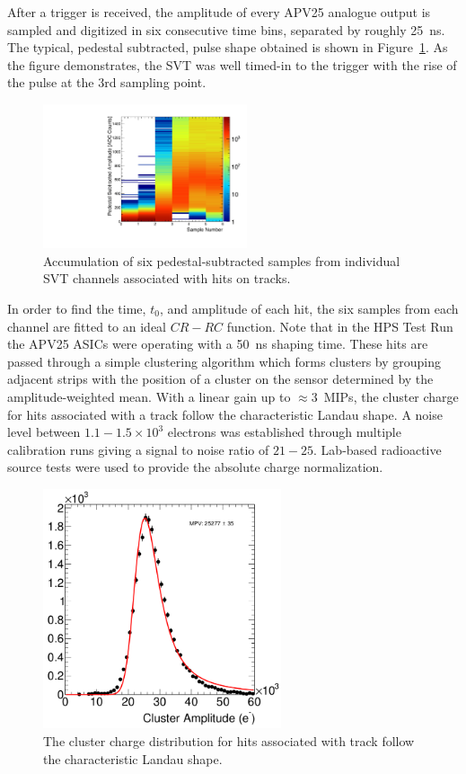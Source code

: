 \documentclass[final,3p,times,twocolumn]{elsarticle}
\begin{document}
After a trigger is received, the amplitude  of every  APV25 analogue output is sampled and digitized in 
six consecutive time bins, separated by roughly 25~ns.  
The typical, pedestal subtracted, pulse shape obtained is shown in Figure~\ref{fig:pulse_shape}. 
As the figure demonstrates,  the SVT was well timed-in to the trigger with the rise of the pulse at the 3rd 
sampling point.  
\begin{figure}[]
\begin{center}
{\small
	\includegraphics[width=6cm]{figures/run1351_110513_samples_L1_top.pdf}
	\caption{Accumulation of six pedestal-subtracted samples from individual SVT channels associated 
	with hits on tracks.}
	\label{fig:pulse_shape}
}
\end{center}
\end{figure}
In order to find the time, $t_0$, and amplitude of each hit, the six samples from each channel are fitted 
to an ideal $CR-RC$ function. Note that in the HPS Test Run the APV25 ASICs were operating with a 50~ns 
shaping time. These hits are passed through a simple clustering algorithm which forms clusters by 
grouping adjacent strips with the position of a cluster on the sensor determined by the 
amplitude-weighted mean.
With a linear gain up to $\approx 3$~MIPs, the cluster charge for hits associated with a track follow 
the characteristic Landau shape. 
A noise level between $1.1-1.5\times 10^{3}$ electrons was established through multiple calibration 
runs giving a signal to noise ratio of $21-25$. Lab-based radioactive source tests were used to 
provide the absolute charge normalization.
\begin{figure}[]
\begin{center}
{\small
	\includegraphics[width=7cm]{figures/mip_top_layer_2.png}
    	\caption{ The cluster charge distribution for hits associated with track follow the characteristic 		Landau shape. }
	\label{fig:cluster_pulse}
}
\end{center}
\end{figure}
\end{document}
